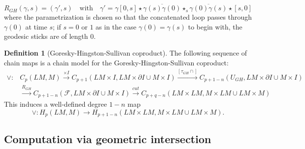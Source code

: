 \documentclass[reqno]{amsart}
\theoremstyle{definition}
\newtheorem{definition}[theorem]{Definition}
\theoremstyle{remark}
\begin{document}
 \[
 R_{GH}(\gamma, s) = \left( \gamma', s \right) \quad
 \text{with} \quad
 \gamma' = \gamma \left[ 0,s \right] \star
 \overline{\gamma(s) \gamma(0)} \star_s 
 \overline{\gamma(0) \gamma(s)} \star
 \left[ s,0 \right] 
 \] 
 where the parametrization is chosen so that the concatenated loop
 passes through $\gamma(0)$ at time $s$; if $s = 0$ or $1$ as
 in the case $\gamma(0) = \gamma(s)$ to begin with, the
 geodesic sticks are of length $0$.

 \begin{definition}[Goresky-Hingston-Sullivan coproduct]
     The following sequence of chain maps is a chain model for
     the Goresky-Hingston-Sullivan coproduct:
     \begin{align*}
         \vee \colon 
         &C_p(LM,M) 
         \stackrel{\times I}{\longrightarrow} 
         C_{p+1}(LM \times I, LM \times \partial I \cup 
         M \times I) \stackrel{\left[ \tau_{GH} \cap \right] }{\longrightarrow} 
         C_{p+1-n}\left( U_{GH}, LM \times \partial I 
         \cup M \times I \right) \\
         &\stackrel{R_{GH}}{\longrightarrow} 
         C_{p+1-n}\left( \mathcal{F}, LM \times \partial I \cup 
         M \times I\right) \stackrel{cut}{\longrightarrow} 
         C_{p+q-n}\left( LM \times LM, M \times LM \cup 
         LM \times M \right) 
     \end{align*}
     This induces a well-defined degree $1-n$ map
     \[
     \vee \colon H_p (LM,M) \to 
     H_{p+1-n}\left( LM \times LM, M \times LM \cup 
     LM \times M \right) .
     \] 
 \end{definition}











\subsection{Computation via geometric intersection}
\end{document}
